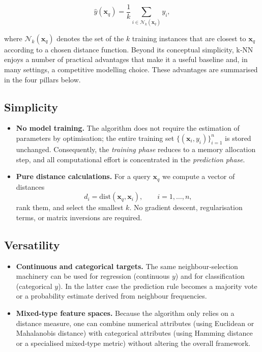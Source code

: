 \documentclass[12pt, a4paper]{article}
\begin{document}
\[
\hat{y}(\mathbf{x}_q)=\frac{1}{k}\sum_{i\in\mathcal N_k(\mathbf{x}_q)} y_i ,
\]

where \(\mathcal N_k(\mathbf{x}_q)\) denotes the set of the \(k\) training instances that are closest to \(\mathbf{x}_q\) according to a chosen distance function.  
Beyond its conceptual simplicity, k‑NN enjoys a number of practical advantages that make it a useful baseline and, in many settings, a competitive modelling choice.  These advantages are summarised in the four pillars below.

\subsection{Simplicity}
\begin{itemize}
    \item \textbf{No model training.}  The algorithm does not require the estimation of parameters by optimisation; the entire training set \(\{(\mathbf{x}_i,y_i)\}_{i=1}^n\) is stored unchanged.  Consequently, the \emph{training phase} reduces to a memory allocation step, and all computational effort is concentrated in the \emph{prediction phase}.
    \item \textbf{Pure distance calculations.}  For a query \(\mathbf{x}_q\) we compute a vector of distances 
    \[
    d_i = \mathrm{dist}(\mathbf{x}_q,\mathbf{x}_i), \qquad i=1,\dots,n,
    \]
    rank them, and select the smallest \(k\).  No gradient descent, regularisation terms, or matrix inversions are required.
\end{itemize}

\subsection{Versatility}
\begin{itemize}
    \item \textbf{Continuous and categorical targets.}  The same neighbour‑selection machinery can be used for regression (continuous \(y\)) and for classification (categorical \(y\)).  In the latter case the prediction rule becomes a majority vote or a probability estimate derived from neighbour frequencies.
    \item \textbf{Mixed‑type feature spaces.}  Because the algorithm only relies on a distance measure, one can combine numerical attributes (using Euclidean or Mahalanobis distance) with categorical attributes (using Hamming distance or a specialised mixed‑type metric) without altering the overall framework.
\end{itemize}
\end{document}

